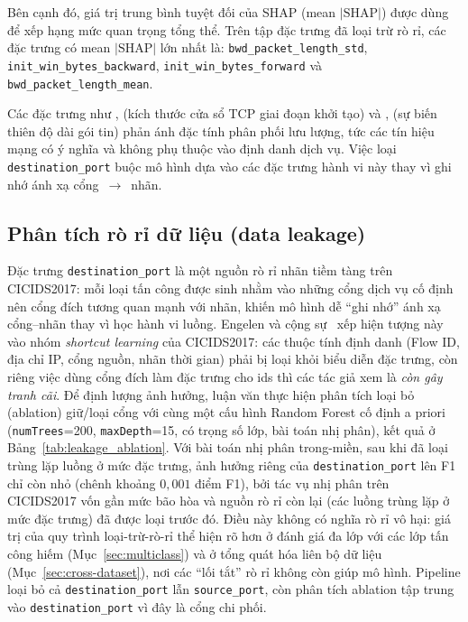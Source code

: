 Bên cạnh đó, giá trị trung bình tuyệt đối của SHAP (mean $|\text{SHAP}|$) được dùng để xếp hạng mức quan trọng tổng thể. Trên tập đặc trưng đã loại trừ rò rỉ, các đặc trưng có mean $|\text{SHAP}|$ lớn nhất là: \texttt{bwd\_packet\_length\_std}, \texttt{init\_win\_bytes\_backward}, \texttt{init\_win\_bytes\_forward} và \texttt{bwd\_packet\_length\_mean}.

Các đặc trưng như \texttt{}, \texttt{} (kích thước cửa sổ TCP giai đoạn khởi tạo) và \texttt{}, \texttt{} (sự biến thiên độ dài gói tin) phản ánh đặc tính phân phối lưu lượng, tức các tín hiệu mạng có ý nghĩa và không phụ thuộc vào định danh dịch vụ. Việc loại \texttt{destination\_port} buộc mô hình dựa vào các đặc trưng hành vi này thay vì ghi nhớ ánh xạ cổng~$\rightarrow$~nhãn.

\subsection{Phân tích rò rỉ dữ liệu (data leakage)}
\label{sec:leakage_analysis}

Đặc trưng \texttt{destination\_port} là một nguồn rò rỉ nhãn tiềm tàng trên CICIDS2017: mỗi loại tấn công được sinh nhằm vào những cổng dịch vụ cố định nên cổng đích tương quan mạnh với nhãn, khiến mô hình dễ ``ghi nhớ'' ánh xạ cổng--nhãn thay vì học hành vi luồng. Engelen và cộng sự~\cite{engelen2021troubleshooting} xếp hiện tượng này vào nhóm \emph{shortcut learning} của CICIDS2017: các thuộc tính định danh (Flow ID, địa chỉ IP, cổng nguồn, nhãn thời gian) phải bị loại khỏi biểu diễn đặc trưng, còn riêng việc dùng cổng đích làm đặc trưng cho \ac{ids} thì các tác giả xem là \emph{còn gây tranh cãi}. Để định lượng ảnh hưởng, luận văn thực hiện phân tích loại bỏ (ablation) giữ/loại cổng với cùng một cấu hình Random Forest cố định a priori (\texttt{numTrees}=200, \texttt{maxDepth}=15, có trọng số lớp, bài toán nhị phân), kết quả ở Bảng~\ref{tab:leakage_ablation}. Với bài toán nhị phân trong-miền, sau khi đã loại trùng lặp luồng ở mức đặc trưng, ảnh hưởng riêng của \texttt{destination\_port} lên F1 chỉ còn nhỏ (chênh khoảng $0{,}001$ điểm F1), bởi tác vụ nhị phân trên CICIDS2017 vốn gần mức bão hòa và nguồn rò rỉ còn lại (các luồng trùng lặp ở mức đặc trưng) đã được loại trước đó. Điều này không có nghĩa rò rỉ vô hại: giá trị của quy trình loại-trừ-rò-rỉ thể hiện rõ hơn ở đánh giá đa lớp với các lớp tấn công hiếm (Mục~\ref{sec:multiclass}) và ở tổng quát hóa liên bộ dữ liệu (Mục~\ref{sec:cross-dataset}), nơi các ``lối tắt'' rò rỉ không còn giúp mô hình. Pipeline loại bỏ cả \texttt{destination\_port} lẫn \texttt{source\_port}, còn phân tích ablation tập trung vào \texttt{destination\_port} vì đây là cổng chi phối.

